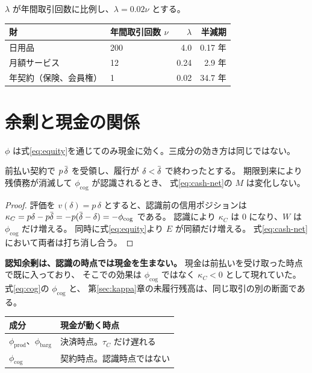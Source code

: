 \begin{example}[頻度と半減期]
$\lambda$ が年間取引回数に比例し、$\lambda = 0.02\nu$ とする。
\begin{center}
\begin{tabular}{@{}llrr@{}}
\toprule
財 & 年間取引回数 $\nu$ & $\lambda$ & 半減期 \\
\midrule
日用品 & 200 & 4.0 & 0.17 年 \\
月額サービス & 12 & 0.24 & 2.9 年 \\
年契約（保険、会員権） & 1 & 0.02 & 34.7 年 \\
\bottomrule
\end{tabular}
\label{tab:decay-halflife-example}
\end{center}

\section{余剰と現金の関係}
\label{sec:surplus-cash}

$\phi$ は式\eqref{eq:equity}を通じてのみ現金に効く。三成分の効き方は同じではない。

\begin{proposition}[認知余剰の認識は現金を動かさない]
\label{prop:cog-cash-neutral}
前払い契約で $p\,\dbar$ を受領し、履行が $\delta<\dbar$ で終わったとする。
期限到来により残債務が消滅して $\phi_{\mathrm{cog}}$ が認識されるとき、
式\eqref{eq:cash-net}の $M$ は変化しない。
\end{proposition}

\begin{proof}
評価を $v(\delta)=p\,\delta$ とすると、認識前の信用ポジションは
$\kappa_C = p\delta - p\dbar = -p(\dbar-\delta) = -\phi_{\mathrm{cog}}$ である。
認識により $\kappa_C$ は $0$ になり、$W$ は $\phi_{\mathrm{cog}}$ だけ増える。
同時に式\eqref{eq:equity}より $E$ が同額だけ増える。
式\eqref{eq:cash-net}において両者は打ち消し合う。
\end{proof}

\textbf{認知余剰は、認識の時点では現金を生まない。}
現金は前払いを受け取った時点で既に入っており、
そこでの効果は $\phi_{\mathrm{cog}}$ ではなく $\kappa_C<0$ として現れていた。
式\eqref{eq:cog}の $\phi_{\mathrm{cog}}$ と、
第\ref{sec:kappa}章の未履行残高は、同じ取引の別の断面である。

\begin{center}
\begin{tabularx}{\textwidth}{@{}lX@{}}
\toprule
成分 & 現金が動く時点 \\
\midrule
$\phi_{\mathrm{prod}}$、$\phi_{\mathrm{barg}}$ & 決済時点。$\tau_C$ だけ遅れる \\
$\phi_{\mathrm{cog}}$ & 契約時点。認識時点ではない \\
\bottomrule
\end{tabularx}
\label{tab:surplus-cash-timing}
\end{center}


\end{example}
